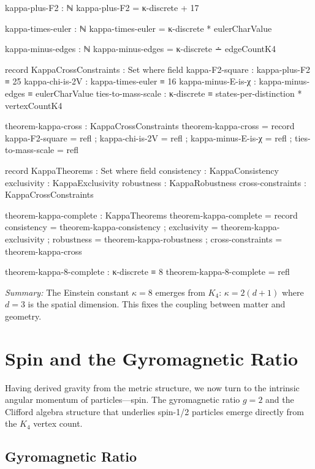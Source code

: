 \documentclass[11pt,a4paper]{book}
\begin{document}
\begin{code}
kappa-plus-F2 : ℕ
kappa-plus-F2 = κ-discrete + 17

kappa-times-euler : ℕ
kappa-times-euler = κ-discrete * eulerCharValue

kappa-minus-edges : ℕ
kappa-minus-edges = κ-discrete ∸ edgeCountK4

record KappaCrossConstraints : Set where
  field
    kappa-F2-square     : kappa-plus-F2 ≡ 25
    kappa-chi-is-2V     : kappa-times-euler ≡ 16
    kappa-minus-E-is-χ  : kappa-minus-edges ≡ eulerCharValue
    ties-to-mass-scale  : κ-discrete ≡ states-per-distinction * vertexCountK4

theorem-kappa-cross : KappaCrossConstraints
theorem-kappa-cross = record
  { kappa-F2-square     = refl
  ; kappa-chi-is-2V     = refl
  ; kappa-minus-E-is-χ  = refl
  ; ties-to-mass-scale  = refl
  }

record KappaTheorems : Set where
  field
    consistency      : KappaConsistency
    exclusivity      : KappaExclusivity
    robustness       : KappaRobustness
    cross-constraints : KappaCrossConstraints

theorem-kappa-complete : KappaTheorems
theorem-kappa-complete = record
  { consistency      = theorem-kappa-consistency
  ; exclusivity      = theorem-kappa-exclusivity
  ; robustness       = theorem-kappa-robustness
  ; cross-constraints = theorem-kappa-cross
  }

theorem-kappa-8-complete : κ-discrete ≡ 8
theorem-kappa-8-complete = refl
\end{code}

\medskip
\noindent\textit{Summary:} The Einstein constant $\kappa = 8$ emerges from $K_4$: 
$\kappa = 2(d+1)$ where $d=3$ is the spatial dimension. This fixes the coupling 
between matter and geometry.

\chapter{Spin and the Gyromagnetic Ratio}
\label{chap:spin-gyromagnetic}

Having derived gravity from the metric structure, we now turn to the intrinsic angular 
momentum of particles—spin. The gyromagnetic ratio $g=2$ and the Clifford algebra 
structure that underlies spin-1/2 particles emerge directly from the $K_4$ vertex count.

\section{Gyromagnetic Ratio}
\end{document}
